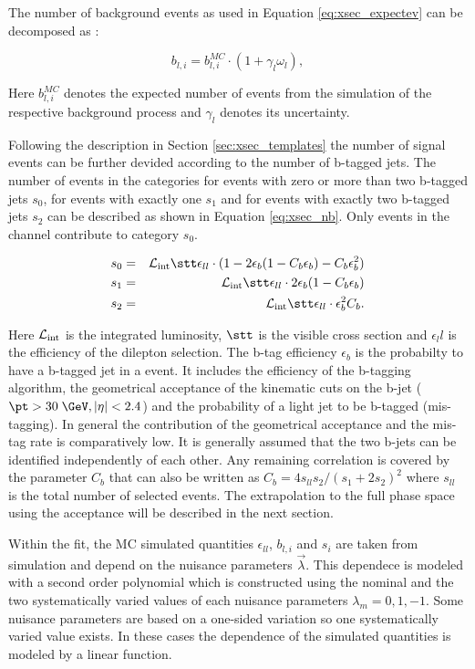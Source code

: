 The number of background events as used in Equation \ref{eq:xsec_expectev} can be decomposed as :

\begin{equation}
b_{l,i} = b_{l,i}^{MC} \cdot (1 + \gamma_l \omega_l),
\label{eq:nbli}
\end{equation}

Here $b_{l,i}^{MC}$ denotes the expected number of events from the simulation of the respective background process and $\gamma_l$ denotes its uncertainty.

Following the description in Section \ref{sec:xsec_templates}  the number of signal events can be further devided according to the number of b-tagged jets.
The number of events in the categories for events with zero or more than two b-tagged jets $s_0$, for events with exactly one $s_1$ and for events with exactly two b-tagged jets $s_2$ can be described as shown in Equation \ref{eq:xsec_nb}. Only events in the \emu channel contribute to category $s_0$.

\begin{eqnarray}
s_0  &=& \mathcal{L}_{\rm int}\stt \epsilon_{ll} \cdot (1-2\epsilon_b(1-C_b\epsilon_b)-C_b\epsilon_b^2) \\
s_1  &=& \mathcal{L}_{\rm int} \stt \epsilon_{ll} \cdot 2 \epsilon_b(1-C_b\epsilon_b) \\
s_2  &=& \mathcal{L}_{\rm int} \stt \epsilon_{ll} \cdot   \epsilon_b^2 C_b 
\label{eq:xsec_nb}.
\end{eqnarray}

Here $\mathcal{L}_{\rm int}$ is the integrated luminosity, $\stt$ is the visible \ttbar cross section and $\epsilon_ll$ is the efficiency of the dilepton selection.
The b-tag efficiency $\epsilon_b$ is the probabilty to have a b-tagged jet in a \ttbar event. It includes the efficiency of the b-tagging algorithm, the geometrical acceptance of the kinematic cuts on the b-jet ($\pt > 30\; \GeV, |\eta|<2.4$) and the probability of a light jet to be b-tagged (mis-tagging). In general the contribution of the geometrical acceptance and the mis-tag rate is comparatively low.
It is generally assumed that the two b-jets can be identified independently of each other. Any remaining correlation is covered by the parameter $C_b$ that can also be written as
$C_b=4s_{ll}s_2/(s_1+2s_2)^2$ where $s_{ll}$ is the total number of selected events. 
The extrapolation to the full phase space using the acceptance will be described in the next section.

Within the fit, the MC simulated quantities $\epsilon_{ll}$, $b_{l,i}$ and $s_{i}$ are taken from simulation and depend on the nuisance parameters $\vec{\lambda}$.
This dependece is modeled with a second order polynomial which is constructed using the nominal and the two systematically varied values of each nuisance parameters $\lambda_m=0,1,-1$.
Some nuisance parameters are based on a one-sided variation so one systematically varied value exists. In these cases the dependence of the simulated quantities is modeled by a linear function.

